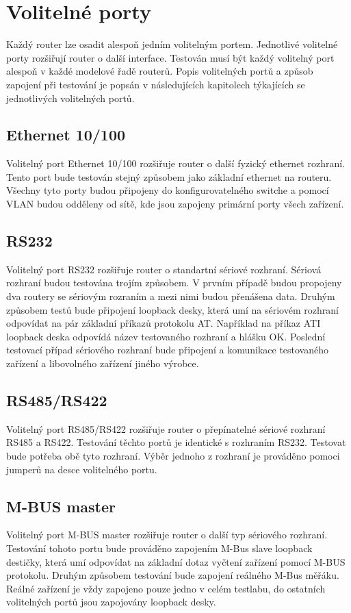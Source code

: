 \section{Volitelné porty}
Každý router lze osadit alespoň jedním volitelným portem. Jednotlivé volitelné porty rozšiřují router o další interface. Testován musí být každý volitelný port alespoň v každé modelové řadě routerů. Popis volitelných portů a způsob zapojení při testování je popsán v následujících kapitolech týkajících se jednotlivých volitelných portů.

\subsection{Ethernet 10/100}
Volitelný port Ethernet 10/100 rozšiřuje router o další fyzický ethernet rozhraní. Tento port bude testován stejný způsobem jako základní ethernet na routeru. Všechny tyto porty budou připojeny do konfigurovatelného switche a pomocí VLAN budou odděleny od sítě, kde jsou zapojeny primární porty všech zařízení.

\subsection{RS232}
Volitelný port RS232 rozšiřuje router o standartní sériové rozhraní. Sériová rozhraní budou testována trojím způsobem. V prvním případě budou propojeny dva routery se sériovým rozraním a mezi nimi budou přenášena data. Druhým způsobem testů bude připojení loopback desky, která umí na sériovém rozhraní odpovídat na pár základní příkazů protokolu AT. Například na příkaz ATI loopback deska odpovídá název testovaného rozhraní a hlášku OK. Poslední testovací případ sériového rozhraní bude připojení a komunikace testovaného zařízení a libovolného zařízení jiného výrobce.

\subsection{RS485/RS422}
Volitelný port RS485/RS422 rozšiřuje router o přepínatelné sériové rozhraní RS485 a RS422. Testování těchto portů je identické s rozhraním RS232. Testovat bude potřeba obě tyto rozhraní. Výběr jednoho z rozhraní je prováděno pomoci jumperů na desce volitelného portu.

\subsection{M-BUS master}
Volitelný port M-BUS master rozšiřuje router o další typ sériového rozhraní. Testování tohoto portu bude prováděno zapojením M-Bus slave loopback destičky, která umí odpovídat na základní dotaz vyčtení zařízení pomocí M-BUS protokolu. Druhým způsobem testování bude zapojení reálného M-Bus měřáku. Reálné zařízení je vždy zapojeno pouze jedno v celém testlabu, do ostatních volitelných portů jsou zapojovány loopback desky.


